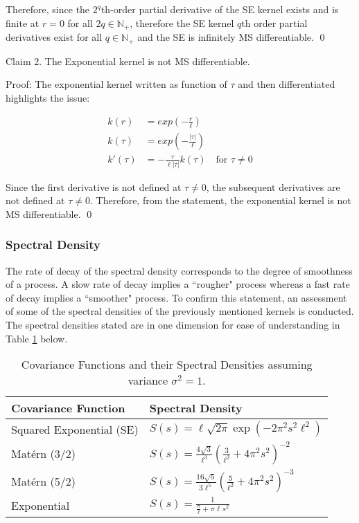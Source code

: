 \documentclass[12pt,a4paper]{article}
\begin{document}
Therefore, since the \(2^q\)th-order partial derivative of the SE kernel exists and is finite at \(r=0\) for all \(2q \in \mathbb{N}_{+}\), therefore the SE kernel \(q\)th order partial derivatives exist for all \(q \in \mathbb{N}_{+}\) and the SE is infinitely MS differentiable.
\hfill \qed

Claim 2. The Exponential kernel is not MS differentiable.

Proof: The exponential kernel written as function of \(\tau\) and then differentiated highlights the issue:

\begin{align*}
k(r) &= exp\left(-\frac{r}{\ell}\right) \\
k(\tau) &= exp\left(-\frac{|\tau|}{\ell}\right) \\
k'(\tau) &= -\frac{{\tau}}{\ell{|\tau|}} k(\tau) \quad \text{for } \tau \neq 0
\end{align*}

Since the first derivative is not defined at \(\tau \neq 0\), the subsequent derivatives are not defined at \(\tau \neq 0\). Therefore, from the statement, the exponential kernel is not MS differentiable.
\hfill \qed

\subsubsection{Spectral Density}

The rate of decay of the spectral density corresponds to the degree of smoothness of a process. A slow rate of decay implies a ``rougher" process whereas a fast rate of decay implies a ``smoother" process. To confirm this statement, an assessment of some of the spectral densities of the previously mentioned kernels is conducted. The spectral densities stated are in one dimension for ease of understanding in Table \ref{tb:Spectral Density kernels} below.

\renewcommand{\arraystretch}{2} %

\begin{table}[ht]
\centering
\begin{tabular}{|l|l|}
\hline
\textbf{Covariance Function} & \textbf{Spectral Density} \\
\hline
Squared Exponential (SE) & $S(s) =  \ell \sqrt{2\pi} \exp\left( -2\pi^2 s^2 \ell^2 \right)$ \citep{williams2006gaussian}\\
\hline
Mat\'{e}rn (3/2) & $S(s) = \frac{4 \sqrt{3}}{\ell^3} \left(\frac{3}{\ell^2} + 4 \pi^2 s^2 \right)^{-2}$ \citep{williams2006gaussian}\\
\hline
Mat\'{e}rn (5/2) & $S(s) = \frac{16 \sqrt{5}}{3\ell^5} \left(\frac{5}{\ell^2} + 4 \pi^2 s^2 \right)^{-3}$ \citep{williams2006gaussian}\\
\hline
Exponential & $S(s) = \frac{1}{\frac{\pi}{\ell} + \pi \ell s^2}$ 
 \citep{HeinonenSpectralKernels2017} \\
\hline
\end{tabular}
\caption{Covariance Functions and their Spectral Densities assuming variance \(\sigma^2 = 1\).}
\label{tb:Spectral Density kernels}
\end{table}
\end{document}
